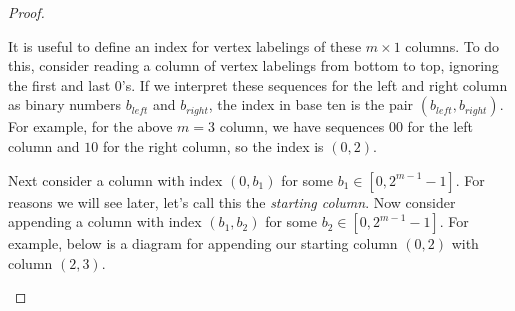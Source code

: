 \begin{proof}
\begin{center}
\end{center}

It is useful to define an index for vertex labelings of these $m \times 1$ columns. To do this, consider reading a column of vertex labelings from bottom to top, ignoring the first and last $0$'s. If we interpret these sequences for the left and right column as binary numbers $b_{left}$ and $b_{right}$, the index in base ten is the pair $(b_{left}, b_{right})$. For example, for the above $m=3$ column, we have sequences $00$ for the left column and $10$ for the right column, so the index is $(0,2)$.

Next consider a column with index $(0, b_{1})$ for some $b_{1} \in [0,2^{m-1}-1]$. For reasons we will see later, let's call this the \textit{starting column}. Now consider appending a column with index $(b_{1}, b_{2})$ for some $b_{2} \in [0,2^{m-1}-1]$. For example, below is a diagram for appending our starting column $(0,2)$ with column $(2,3)$. 

\begin{center}
\end{center}
\end{proof}

